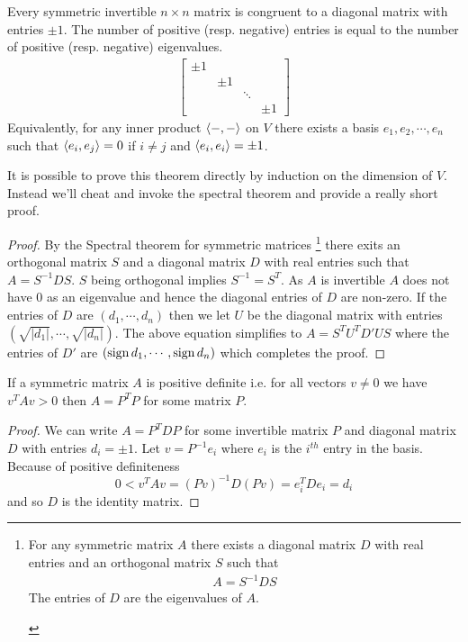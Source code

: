\begin{thm}
	\label{thm:theorem1}
	Every symmetric invertible $n \times n$ matrix is congruent to a diagonal matrix with entries $\pm 1$. The number of positive (resp. negative) entries is equal to the number of positive (resp. negative) eigenvalues.
	\begin{align}
		\begin{bmatrix}
		\pm 1 &       &        &       \\
		      & \pm 1 &        &       \\
		      &       & \ddots &       \\
		      &       &        & \pm 1
		\end{bmatrix}
	\end{align}
	Equivalently, for any inner product $\langle -, - \rangle$ on $V$ there exists a basis $e_1, e_2, \cdots, e_n$ such that $\langle e_i, e_j \rangle = 0$ if $i \neq j$ and $\langle e_i, e_i \rangle = \pm 1$.
\end{thm}
It is possible to prove this theorem directly by induction on the dimension of $V$. Instead we'll cheat and invoke the spectral theorem and provide a really short proof.

\begin{proof}
	By the Spectral theorem for symmetric matrices \footnote{	\begin{thm}
		For any symmetric matrix $A$ there exists a diagonal matrix $D$ with real entries and an orthogonal matrix $S$ such that
		\begin{align}
			A = S^{-1} D S
		\end{align}
		The entries of $D$ are the eigenvalues of $A$.
		\end{thm}
		} there exits an orthogonal matrix $S$ and a diagonal matrix $D$ with real entries such that $A = S^{-1} D S$. $S$ being orthogonal implies $S^{-1} = S^T$. As $A$ is invertible $A$ does not have 0 as an eigenvalue and hence the diagonal entries of $D$ are non-zero. If the entries of $D$ are $(d_1, \cdots, d_n)$ then we let $U$ be the diagonal matrix with entries $(\sqrt{|d_1|}, \cdots, \sqrt{|d_n|})$. The above equation simplifies to $ A = S^T U^T D' U S$ where the entries of $D'$ are $(\operatorname{sign}{d_1}, \cdots, \operatorname{sign}{d_n})$ which completes the proof.
\end{proof}

\begin{cor}
	If a symmetric matrix $A$ is positive definite i.e. for all vectors $v \neq 0$ we have $v^T A v > 0$ then $A = P^T P $ for some matrix $P$.
\end{cor}
\begin{proof}
	We can write $A = P^T D P $ for some invertible matrix $P$ and diagonal matrix $D$ with entries $d_i = \pm 1$. Let $v = P^{-1} e_i$ where $e_i$ is the $i^{th}$ entry in the basis. Because of positive definiteness $$ 0 < v^T A v = (Pv)^{-1}D(Pv) = e_i^T D e_i = d_i$$ and so $D$ is the identity matrix.
\end{proof}


